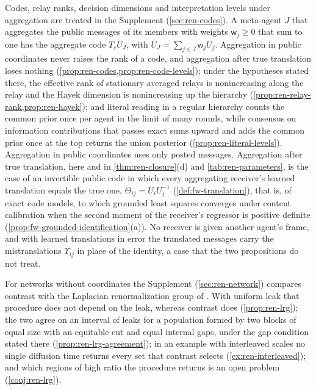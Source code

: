 Codes, relay ranks, decision dimensions and interpretation levels under aggregation are treated in the Supplement (\cref{sec:ren-codes}). A meta-agent $J$ that aggregates the public messages of its members with weights $\mathsf w_j\ge0$ that sum to one has the aggregate code $T_c\bar U_J$, with $\bar U_J=\sum_{j\in J}\mathsf w_jU_j$. Aggregation in public coordinates never raises the rank of a code, and aggregation after true translation loses nothing (\cref{prop:ren-codes,prop:ren-code-levels}); under the hypotheses stated there, the effective rank of stationary averaged relays is nonincreasing along the relay and the Hayek dimension is nonincreasing up the hierarchy (\cref{prop:ren-relay-rank,prop:ren-hayek}); and literal reading in a regular hierarchy counts the common prior once per agent in the limit of many rounds, while consensus on information contributions that passes exact sums upward and adds the common prior once at the top returns the union posterior (\cref{prop:ren-literal-levels}). Aggregation in public coordinates uses only posted messages. Aggregation after true translation, here and in \cref{thm:ren-closure}(d) and \cref{tab:ren-parameters}, is the case of an invertible public code in which every aggregating receiver's learned translation equals the true one, $\Theta_{ij}=U_iU_j^{-1}$ (\cref{def:fw-translation}), that is, of exact code models, to which grounded least squares converges under content calibration when the second moment of the receiver's regressor is positive definite (\cref{prop:fw-grounded-identification}(a)). No receiver is given another agent's frame, and with learned translations in error the translated messages carry the mistranslations $\Upsilon_{ij}$ in place of the identity, a case that the two propositions do not treat.

For networks without coordinates the Supplement (\cref{sec:ren-network}) compares contrast with the Laplacian renormalization group of \citet{villegas2023laplacian}. With uniform leak that procedure does not depend on the leak, whereas contrast does (\cref{prop:ren-lrg}); the two agree on an interval of leaks for a population formed by two blocks of equal size with an equitable cut and equal internal gaps, under the gap condition stated there (\cref{prop:ren-lrg-agreement}); in an example with interleaved scales no single diffusion time returns every set that contrast selects (\cref{ex:ren-interleaved}); and which regions of high ratio the procedure returns is an open problem (\cref{conj:ren-lrg}).

